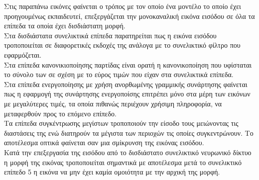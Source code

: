 Στις παραπάνω εικόνες φαίνεται ο τρόπος με τον οποίο ένα μοντέλο το οποίο έχει προηγουμένως εκπαιδευτεί, επεξεργάζεται την μονοκαναλική εικόνα εισόδου σε όλα τα επίπεδα τα οποία έχει δισδιάστατη μορφή.\\

Στα δισδιάστατα συνελικτικά επίπεδα παρατηρείται πως η εικόνα εισόδου τροποποιείται σε διαφορετικές εκδοχές της ανάλογα με το συνελικτικό φίλτρο που εφαρμόζεται.\\

Στα επίπεδα κανονικιοποίησης παρτίδας είναι ορατή η κανονικοποίηση που υφίσταται το σύνολο των  σε σχέση με το εύρος τιμών που είχαν στα συνελικτικά επίπεδα.\\

Στα επίπεδα ενεργοποίησης με χρήση ανορθωμένης γραμμικής συνάρτησης  φαίνεται πως η εφαρμογή της συνάρτησης ενεργοποίσης επιτρέπει μόνο στα μέρη των εικόνων με μεγαλύτερες τιμές, τα οποία πιθανώς περιέχουν χρήσιμη πληροφορία, να μεταφερθούν προς το επόμενο επίπεδο.\\

Τα επίπεδα συγκέντρωσης μεγίστων τροποποιούν την είσοδο τους μειώνοντας τις διαστάσεις της ενώ διατηρούν τα μέγιστα των περιοχών τις οποίες συγκεντρώνουν. Το αποτέλεσμα οπτικά φαίνεται σαν μια σμίκρυνση της εικόνας εισόδου.\\

Κατά την επεξεργασία της εισόδου από το δισδιάστατο συνελικτικό νευρωνικό δίκτυο η μορφή της εικόνας τροποποιείται σημαντικά με αποτέλεσμα μετά το συνελικτικό επίπεδο 5 η εικόνα να μην έχει καμία ομοιότητα με την αρχική της μορφή.